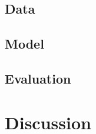 \documentclass[conference]{IEEEtran}
\begin{document}
\subsection{Data}
\subsection{Model}
\subsection{Evaluation}


\section{Discussion}
\end{document}
